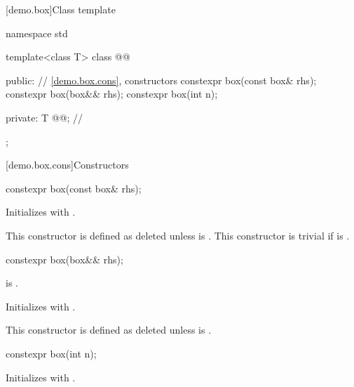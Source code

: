 [demo.box]{Class template }

\begin{codeblock}
namespace std {
  template<class T>
  class @@ {
  public:
    // \ref{demo.box.cons}, constructors
    constexpr box(const box& rhs);
    constexpr box(box&& rhs);
    constexpr box(int n);

  private:
    T @@; // \expos
  };
}
\end{codeblock}

[demo.box.cons]{Constructors}

%
\begin{itemdecl}
constexpr box(const box& rhs);
\end{itemdecl}

\begin{itemdescr}
\pnum
\effects
Initializes  with .

\pnum
\remarks
This constructor is defined as deleted unless  is . This constructor is trivial if  is .
\end{itemdescr}

%
\begin{itemdecl}
constexpr box(box&& rhs);
\end{itemdecl}

\begin{itemdescr}
\pnum
\constraints
{} is .

\pnum
\effects
Initializes  with .

\pnum
\remarks
This constructor is defined as deleted unless  is .
\end{itemdescr}

%
\begin{itemdecl}
constexpr box(int n);
\end{itemdecl}

\begin{itemdescr}
\pnum
\effects
Initializes  with .
\end{itemdescr}
